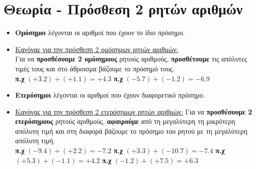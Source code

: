 \documentclass[a4paper,10pt]{report}
\begin{document}
\section*{Θεωρία - Πρόσθεση 2 ρητών αριθμών\hfill \small{}}
\begin{itemize}
 \item \textbf{Ομόσημοι} λέγονται οι αριθμοί που έχουν το ίδιο πρόσημο. 
 \item \underline{ Κανόνας για την πρόσθεση 2 ομόσημων ρητών αριθμών:} \\
       Για να \textbf{προσθέσουμε 2 ομόσημους} ρητούς αριθμούς, 
       \textbf{προσθέτουμε} τις απόλυτες τιμές τους και στο άθροισμα βάζουμε το πρόσημό τους.\\
       \textbf{π.χ} $(+3.2)+(+1.1)=+4.3$
       \textbf{π.χ} $(-5.7)+(-1.2)=-6.9$
 \item \textbf{Ετερόσημοι} λέγονται οι αριθμοί που έχουν διαφορετικό πρόσημο. 
 \item \underline{ Κανόνας για την πρόσθεση 2 ετερόσημων ρητών αριθμών:} 
        Για να \textbf{προσθέσουμε 2 ετερόσημους} ρητούς αριθμούς, 
       \textbf{αφαιρούμε} από τη μεγαλύτερη τη μικρότερη απόλυτη τιμή και στη διαφορά βάζουμε το πρόσημο του 
       ρητού με τη μεγαλύτερη απόλυτη τιμή.\\
       \textbf{π.χ} $(-9.4)+(+2.2)=-7.2$
       \textbf{π.χ} $(+3.3)+(-10.7)=-7.4$
       \textbf{π.χ} $(+5.3)+(-1.1)=+4.2$
       \textbf{π.χ} $(-1.2)+(+7.5)=+6.3$
\end{itemize}
\end{document}
